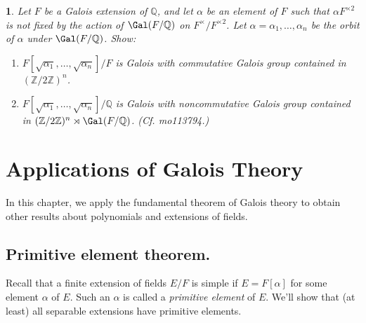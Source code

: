 \documentclass[a4paper,11pt,final,openany]{memoir}
\newtheorem{exercise}[Y]{}
\theoremstyle{nonumberplain}
\begin{document}
\begin{exercise}
\label{x20c}Let $F$ be a Galois extension of $\mathbb{Q}{}$, and let $\alpha$
be an element of $F$ such that $\alpha F^{\times2}$ is not fixed by the action
of $\Gal(F/\mathbb{Q}{})$ on $F^{\times}/F^{\times2}$. Let $\alpha=\alpha
_{1},\ldots,\alpha_{n}$ be the orbit of $\alpha$ under $\Gal(F/\mathbb{Q}{})$. Show:

\begin{enumerate}
\item $F[\sqrt{\alpha_{1}},\ldots,\sqrt{\alpha_{n}}]/F$ is Galois with
commutative Galois group contained in $\left(  \mathbb{Z}{}/2\mathbb{Z}%
{}\right)  ^{n}$.

\item $F[\sqrt{\alpha_{1}},\ldots,\sqrt{\alpha_{n}}]/\mathbb{Q}{}$ is Galois
with noncommutative Galois group contained in $(\mathbb{Z}{}/2\mathbb{Z}%
)^{n}\rtimes\Gal(F/\mathbb{Q}{})$. (Cf. mo113794.)
\end{enumerate}
\end{exercise}

\clearpage


\chapter{Applications of Galois Theory}

In this chapter, we apply the fundamental theorem of Galois theory to obtain
other results about polynomials and extensions of fields.

\section{Primitive element theorem.}%

%


\noindent Recall that a finite extension of fields $E/F$ is simple if
$E=F[\alpha]$ for some element $\alpha$ of $E$. Such an $\alpha$ is called a
\emph{primitive element\/}%
of $E$. We'll show that (at least) all separable extensions have primitive elements.
\end{document}
